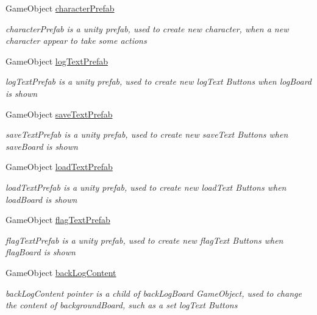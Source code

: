 \begin{DoxyCompactItemize}
Game\+Object \hyperlink{class_world_control_af951d6403f0090baafc0ddc1fdc7645d}{character\+Prefab}
\begin{DoxyCompactList}\small\item\em character\+Prefab is a unity prefab, used to create new character, when a new character appear to take some actions \end{DoxyCompactList}\item 
Game\+Object \hyperlink{class_world_control_ad4dd5b29a3dfc1a483dd22698bbd6113}{log\+Text\+Prefab}
\begin{DoxyCompactList}\small\item\em log\+Text\+Prefab is a unity prefab, used to create new log\+Text Buttons when log\+Board is shown \end{DoxyCompactList}\item 
Game\+Object \hyperlink{class_world_control_a83c0fc4db2fd739e7b02f2a77b772b57}{save\+Text\+Prefab}
\begin{DoxyCompactList}\small\item\em save\+Text\+Prefab is a unity prefab, used to create new save\+Text Buttons when save\+Board is shown \end{DoxyCompactList}\item 
Game\+Object \hyperlink{class_world_control_add74a4115effd38e736279d2da60aeca}{load\+Text\+Prefab}
\begin{DoxyCompactList}\small\item\em load\+Text\+Prefab is a unity prefab, used to create new load\+Text Buttons when load\+Board is shown \end{DoxyCompactList}\item 
Game\+Object \hyperlink{class_world_control_a1f4c229d757e5caa8cbfb633acefd609}{flag\+Text\+Prefab}
\begin{DoxyCompactList}\small\item\em flag\+Text\+Prefab is a unity prefab, used to create new flag\+Text Buttons when flag\+Board is shown \end{DoxyCompactList}\item 
Game\+Object \hyperlink{class_world_control_adcd24a2e35284b6f65148c629f50011b}{back\+Log\+Content}
\begin{DoxyCompactList}\small\item\em back\+Log\+Content pointer is a child of back\+Log\+Board Game\+Object, used to change the content of background\+Board, such as a set log\+Text Buttons \end{DoxyCompactList}\item 

\end{DoxyCompactItemize}
